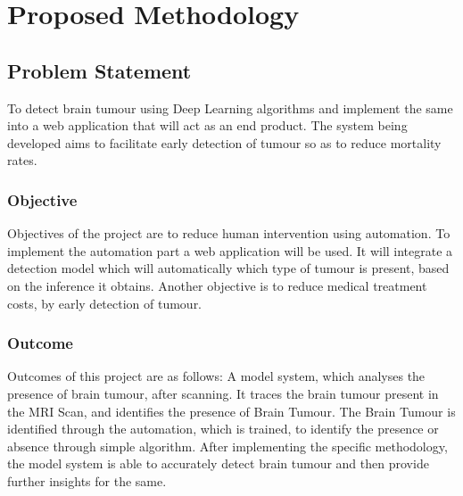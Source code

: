 \chapter{Proposed Methodology}
\section{Problem Statement}
To detect brain tumour using Deep Learning algorithms and implement the same into a web application that will act as an end product. The system being developed aims to facilitate early detection of tumour so as to reduce mortality rates. 
\subsection{Objective}
Objectives of the project are to reduce human intervention using automation. To implement the automation part a web application will be used. It will integrate a detection model which will automatically which type of tumour is present, based on the inference it obtains. Another objective is to reduce medical treatment costs, by early detection of tumour.

\subsection{Outcome}
Outcomes of this project are as follows:
A model system, which analyses the presence of brain tumour, after scanning. It traces the brain tumour present in the MRI Scan, and identifies the presence of Brain Tumour. The Brain Tumour is identified through the automation, which is trained, to identify the presence or absence through simple algorithm. After implementing the specific methodology, the model system is able to accurately detect brain tumour and then provide further insights for the same.

